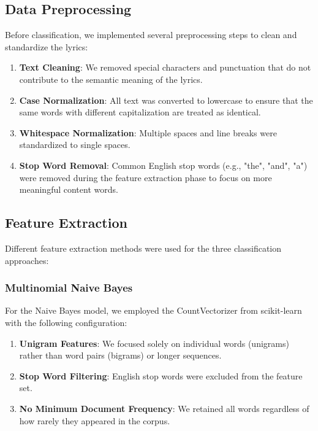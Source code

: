 \documentclass[conference]{IEEEtran}
\begin{document}
\subsection{Data Preprocessing}
Before classification, we implemented several preprocessing steps to clean and standardize the lyrics:
\begin{enumerate}
\item \textbf{Text Cleaning}: We removed special characters and punctuation that do not contribute to the semantic meaning of the lyrics.
\item \textbf{Case Normalization}: All text was converted to lowercase to ensure that the same words with different capitalization are treated as identical.
\item \textbf{Whitespace Normalization}: Multiple spaces and line breaks were standardized to single spaces.
\item \textbf{Stop Word Removal}: Common English stop words (e.g., "the", "and", "a") were removed during the feature extraction phase to focus on more meaningful content words.
\end{enumerate}

\subsection{Feature Extraction}
Different feature extraction methods were used for the three classification approaches:

\subsubsection{Multinomial Naive Bayes}
For the Naive Bayes model, we employed the CountVectorizer from scikit-learn with the following configuration:
\begin{enumerate}
\item \textbf{Unigram Features}: We focused solely on individual words (unigrams) rather than word pairs (bigrams) or longer sequences.
\item \textbf{Stop Word Filtering}: English stop words were excluded from the feature set.
\item \textbf{No Minimum Document Frequency}: We retained all words regardless of how rarely they appeared in the corpus.
\end{enumerate}
\end{document}

